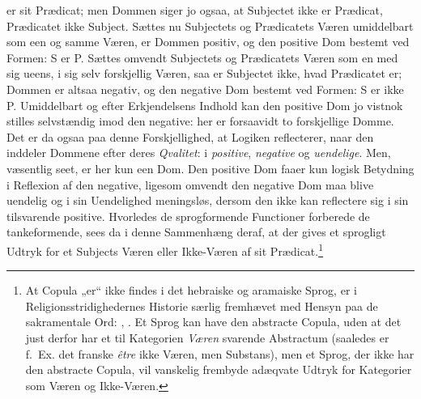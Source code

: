 \documentclass[12pt]{book}
\newcommand{\opage}[1]{\marginnote{\footnotesize\textit{[#1]}}}
\begin{document}
\opage{55}er sit Prædicat; men Dommen siger jo ogsaa, at Subjectet ikke er Prædicat, Prædicatet ikke Subject. Sættes nu Subjectets og Prædicatets Væren umiddelbart som een og samme Væren, er Dommen positiv, og den positive Dom bestemt ved Formen: S er P. Sættes omvendt Subjectets og Prædicatets Væren som en med sig ueens, i sig selv forskjellig Væren, saa er Subjectet ikke, hvad Prædicatet er; Dommen er altsaa negativ, og den negative Dom bestemt ved Formen: S er ikke P. Umiddelbart og efter Erkjendelsens Indhold kan den positive Dom jo vistnok stilles selvstændig imod den negative: her er forsaavidt to forskjellige Domme. Det er da ogsaa paa denne Forskjellighed, at Logiken reflecterer, naar den inddeler Dommene efter deres \emph{Qvalitet}: i \emph{positive}, \emph{negative} og \emph{uendelige}. Men, væsentlig seet, er her kun een Dom. Den positive Dom faaer kun logisk Betydning i Reflexion af den negative, ligesom omvendt den negative Dom maa blive uendelig og i sin Uendelighed meningsløs, dersom den ikke kan reflectere sig i sin tilsvarende positive. Hvorledes de sprogformende Functioner forberede de tankeformende, sees da i denne Sammenhæng deraf, at der gives et sprogligt Udtryk for et Subjects Væren eller Ikke-Væren af sit Prædicat.\footnote{At Copula „er“ ikke findes i det hebraiske og aramaiske Sprog, er i Religionsstridighedernes Historie særlig fremhævet med Hensyn paa de sakramentale Ord: , .
 Et Sprog kan have den abstracte Copula, uden at det just derfor har et til Kategorien \emph{Væren} svarende Abstractum (saaledes er f.~Ex. det franske \textit{être} ikke Væren, men Substans), men et Sprog, der ikke har den abstracte Copula, vil vanskelig frembyde adæqvate Udtryk for Kategorier som Væren og Ikke-Væren.}%
\end{document}
